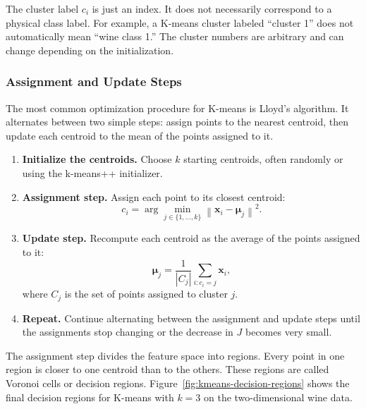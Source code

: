 \documentclass[12pt,letter]{article}
\begin{document}
The cluster label \(c_i\) is just an index. It does not necessarily correspond to a physical class label. For example, a K-means cluster labeled ``cluster 1'' does not automatically mean ``wine class 1.'' The cluster numbers are arbitrary and can change depending on the initialization.

\subsubsection{Assignment and Update Steps}

The most common optimization procedure for K-means is Lloyd's algorithm. It alternates between two simple steps: assign points to the nearest centroid, then update each centroid to the mean of the points assigned to it.

\begin{enumerate}
    \item \textbf{Initialize the centroids.} Choose \(k\) starting centroids, often randomly or using the k-means++ initializer.

    \item \textbf{Assignment step.} Assign each point to its closest centroid:
    \begin{equation}
        c_i
        =
        \arg\min_{j \in \{1,\dots,k\}}
        \left\lVert
        \mathbf{x}_i-\boldsymbol{\mu}_j
        \right\rVert^2 .
        \label{eq:kmeans_assignment}
    \end{equation}

    \item \textbf{Update step.} Recompute each centroid as the average of the points assigned to it:
    \begin{equation}
        \boldsymbol{\mu}_j
        =
        \frac{1}{|C_j|}
        \sum_{i:c_i=j}
        \mathbf{x}_i ,
        \label{eq:kmeans_update}
    \end{equation}
    where \(C_j\) is the set of points assigned to cluster \(j\).

    \item \textbf{Repeat.} Continue alternating between the assignment and update steps until the assignments stop changing or the decrease in \(J\) becomes very small.
\end{enumerate}

The assignment step divides the feature space into regions. Every point in one region is closer to one centroid than to the others. These regions are called Voronoi cells or decision regions. Figure~\ref{fig:kmeans-decision-regions} shows the final decision regions for K-means with \(k=3\) on the two-dimensional wine data.
\end{document}

